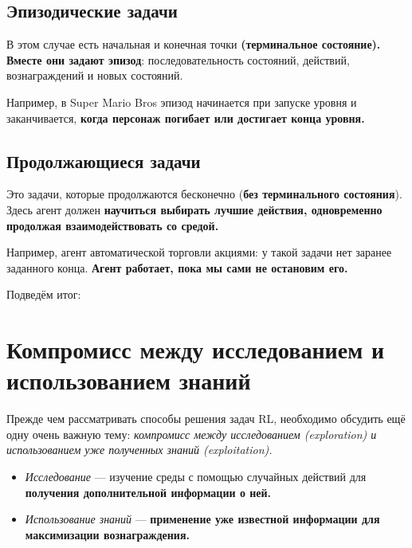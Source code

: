 \documentclass[11pt,a4paper]{article}
\begin{document}
\subsection{Эпизодические задачи}\label{episodic-task}

В этом случае есть начальная и конечная точки \textbf{(терминальное состояние). Вместе они задают эпизод}: последовательность состояний, действий, вознаграждений и новых состояний.

Например, в Super Mario Bros эпизод начинается при запуске уровня и заканчивается, \textbf{когда персонаж погибает или достигает конца уровня.}


\subsection{Продолжающиеся задачи}\label{continuing-tasks}

Это задачи, которые продолжаются бесконечно (\textbf{без терминального состояния}). Здесь агент должен \textbf{научиться выбирать лучшие действия, одновременно продолжая взаимодействовать со средой.}

Например, агент автоматической торговли акциями: у такой задачи нет заранее заданного конца. \textbf{Агент работает, пока мы сами не остановим его.}


Подведём итог:


\section{Компромисс между исследованием и использованием знаний}\label{the-explorationexploitation-trade-off}

Прежде чем рассматривать способы решения задач RL, необходимо обсудить ещё одну очень важную тему: \emph{компромисс между исследованием (exploration) и использованием уже полученных знаний (exploitation).}

\begin{itemize}
\tightlist
\item
  \emph{Исследование} --- изучение среды с помощью случайных действий для \textbf{получения дополнительной информации о ней.}
\item
  \emph{Использование знаний} --- \textbf{применение уже известной информации для максимизации вознаграждения.}
\end{itemize}
\end{document}
